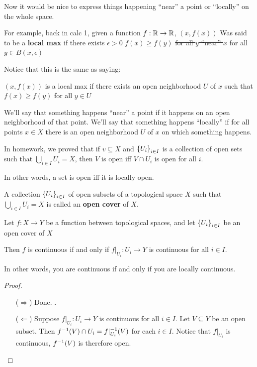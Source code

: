 \documentclass[12pt, twosided]{article}
\begin{document}
  Now it would be nice to express things happening ``near'' a point or ``locally'' on the whole space.

  \begin{exa}
    For example, back in calc 1, given a function \(f: \mathbb{R} \to \mathbb{R}\), \((x, f(x))\) Was said to be a \textbf{local max} if {\color{red}there exists \(\epsilon > 0\)} \(f(x) \geq f(y)\) \sout{for all \(y\) ``near'' \(x\)} {\color{red} for all \(y \in B(x, \epsilon)\)}

    Notice that this is the same as saying:

    \((x, f(x))\) is a local max if there exists an open neighborhood \(U\) of \(x\) such that \(f(x) \geq f(y)\) for all \(y \in U\)
  \end{exa}


  We'll say that something happens ``near'' a point if it happens on an open neighborhood of that point. We'll say that something happens ``locally'' if for all points \(x \in X\) there is an open neighborhood \(U \) of \(x\)  on which something happens.

  In homework, we proved that if \(v \subseteq X\) and \(\left\{ U_i \right\}_{i \in I}\) is a collection of open sets such that \(\bigcup_{i \in I} U_i = X\), then \(V\) is open iff \(V \cap U_i\) is open for all \(i\).

  In other words, a set is open iff it is locally open.

  \begin{df}
    A collection \(\left\{ U_i\right\}_{i \in I}\) of open subsets of a topological space \(X\) such that \(\bigcup_{i \in I} U_i = X\) is called an \textbf{open cover} of \(X\). 
  \end{df}

  \begin{thm}
    Let \(f: X \to Y\) be a function between topological spaces, and let \(\left\{ U_i \right\}_{i \in I}\) be an open cover of \(X\)

    Then \(f\) is continuous if and only if \(f\vert_{U_i}: U_i \to Y\) is continuous for all \(i \in I\).
  \end{thm}

  In other words, you are continuous if and only if you are locally continuous.

  \begin{proof}
    \begin{enumerate}
    \item [(\(\Rightarrow\))] Done. \partdone.
    \item [(\(\Leftarrow\))] Suppose \(f\vert_{U_i}: U_i \to Y\) is continuous for all \(i \in I\). Let \(V \subseteq Y\) be an open subset. Then \(f^{-1}(V) \cap U_i = f\vert_{U_i}^{-1}(V)\) for each \(i \in I\). Notice that \(f\vert_{U_i}\) is continuous, \(f^{-1}(V)\) is therefore open.
    \end{enumerate}
  \end{proof}
\end{document}
